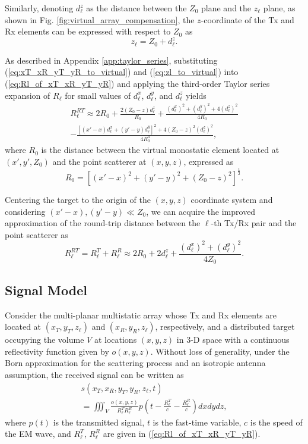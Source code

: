 \documentclass{ieeeaccess}
\begin{document}
Similarly, denoting $d_\ell^z$ as the distance between the $Z_0$ plane and the $z_\ell$ plane, as shown in Fig. \ref{fig:virtual_array_compensation}, the $z$-coordinate of the Tx and Rx elements can be expressed with respect to $Z_0$ as
\begin{equation}
\label{eq:zl_to_virtual}
    z_\ell = Z_0 + d_\ell^z.
\end{equation}

As described in Appendix \ref{app:taylor_series}, substituting (\ref{eq:xT_xR_yT_yR_to_virtual}) and (\ref{eq:zl_to_virtual}) into (\ref{eq:Rl_of_xT_xR_yT_yR}) and applying the third-order Taylor series expansion of $R_\ell$ for small values of $d_\ell^x$, $d_\ell^y$, and $d_\ell^z$ yields
\begin{multline}
\label{Rl_approximation1}
    R_\ell^{RT}\approx 2R_0 + \frac{2(Z_0-z)d_\ell^z}{R_0} + \frac{(d_\ell^x)^2 + (d_\ell^y)^2 + 4(d_\ell^z)^2}{4R_0} \\
    - \frac{\left[(x'-x)d_\ell^x + (y'-y)d_\ell^y\right]^2 + 4(Z_0-z)^2 (d_\ell^z)^2}{4R_0^3},
\end{multline}
where $R_0$ is the distance between the virtual monostatic element located at $(x',y',Z_0)$ and the point scatterer at $(x,y,z)$, expressed as
\begin{equation}
\label{eq:R0}
    R_0 = \left[ (x'-x)^2 + (y'-y)^2 + (Z_0-z)^2 \right]^{\frac{1}{2}}.
\end{equation}

Centering the target to the origin of the $(x,y,z)$ coordinate system and considering $(x'-x),(y'-y) \ll Z_0$, we can acquire the improved approximation of the round-trip distance between the $\ell$-th Tx/Rx pair and the point scatterer as
\begin{equation}
\label{eq:Rl_best_approximation}
    R_\ell^{RT}= R_\ell^T + R_\ell^R \approx 2 R_0 + 2 d_\ell^z + \frac{(d_\ell^x)^2 + (d_\ell^y)^2}{4 Z_0}.
\end{equation}

\subsection{Signal Model}
\label{subsec:signal_model}
Consider the multi-planar multistatic array whose Tx and Rx elements are located at $(x_T,y_T,z_\ell)$ and $(x_R,y_R,z_\ell)$, respectively, and a distributed target occupying the volume $V$ at locations $(x,y,z)$ in \mbox{3-D} space with a continuous reflectivity function given by $o(x,y,z)$.
Without loss of generality, under the Born approximation for the scattering process and an isotropic antenna assumption, the received signal can be written as
\begin{multline}
    \label{eq:received_general}
    s(x_T,x_R,y_T,y_R,z_\ell,t) \\ = \iiint_V \frac{o(x,y,z)}{R_\ell^T R_\ell^R} p \left( t - \frac{R_\ell^T}{c} - \frac{R_\ell^R}{c} \right) dx dy dz,
\end{multline}
where $p(t)$ is the transmitted signal, $t$ is the fast-time variable, $c$ is the speed of the EM wave, and $R_\ell^T$, $R_\ell^R$ are given in (\ref{eq:Rl_of_xT_xR_yT_yR}).
\end{document}
